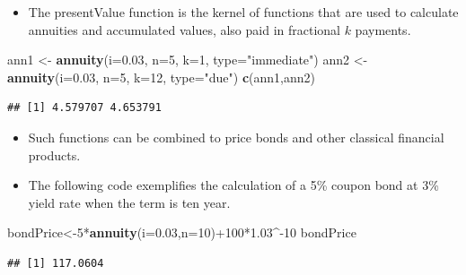 \documentclass[ignorenonframetext,]{beamer}
\newenvironment{Shaded}{\begin{snugshade}}{\end{snugshade}}
\newcommand{\KeywordTok}[1]{\textcolor[rgb]{0.13,0.29,0.53}{\textbf{{#1}}}}
\newcommand{\DataTypeTok}[1]{\textcolor[rgb]{0.13,0.29,0.53}{{#1}}}
\newcommand{\DecValTok}[1]{\textcolor[rgb]{0.00,0.00,0.81}{{#1}}}
\newcommand{\FloatTok}[1]{\textcolor[rgb]{0.00,0.00,0.81}{{#1}}}
\newcommand{\StringTok}[1]{\textcolor[rgb]{0.31,0.60,0.02}{{#1}}}
\newcommand{\NormalTok}[1]{{#1}}
\begin{document}
\begin{frame}[fragile]

\begin{itemize}[<+->]
\itemsep1pt\parskip0pt
\item
  The presentValue function is the kernel of functions that are used to
  calculate annuities and accumulated values, also paid in fractional
  $k$ payments.
\end{itemize}

\begin{Shaded}
\begin{Highlighting}[]
\NormalTok{ann1 <-}\StringTok{ }\KeywordTok{annuity}\NormalTok{(}\DataTypeTok{i=}\FloatTok{0.03}\NormalTok{, }\DataTypeTok{n=}\DecValTok{5}\NormalTok{, }\DataTypeTok{k=}\DecValTok{1}\NormalTok{, }\DataTypeTok{type=}\StringTok{"immediate"}\NormalTok{)}
\NormalTok{ann2 <-}\StringTok{ }\KeywordTok{annuity}\NormalTok{(}\DataTypeTok{i=}\FloatTok{0.03}\NormalTok{, }\DataTypeTok{n=}\DecValTok{5}\NormalTok{, }\DataTypeTok{k=}\DecValTok{12}\NormalTok{, }\DataTypeTok{type=}\StringTok{"due"}\NormalTok{)}
\KeywordTok{c}\NormalTok{(ann1,ann2)}
\end{Highlighting}
\end{Shaded}

\begin{verbatim}
## [1] 4.579707 4.653791
\end{verbatim}

\end{frame}

\begin{frame}[fragile]

\begin{itemize}[<+->]
\item
  Such functions can be combined to price bonds and other classical
  financial products.
\item
  The following code exemplifies the calculation of a 5\% coupon bond at
  3\% yield rate when the term is ten year.
\end{itemize}

\begin{Shaded}
\begin{Highlighting}[]
\NormalTok{bondPrice<-}\DecValTok{5}\NormalTok{*}\KeywordTok{annuity}\NormalTok{(}\DataTypeTok{i=}\FloatTok{0.03}\NormalTok{,}\DataTypeTok{n=}\DecValTok{10}\NormalTok{)+}\DecValTok{100}\NormalTok{*}\FloatTok{1.03}\NormalTok{^-}\DecValTok{10}
\NormalTok{bondPrice}
\end{Highlighting}
\end{Shaded}

\begin{verbatim}
## [1] 117.0604
\end{verbatim}

\end{frame}
\end{document}
